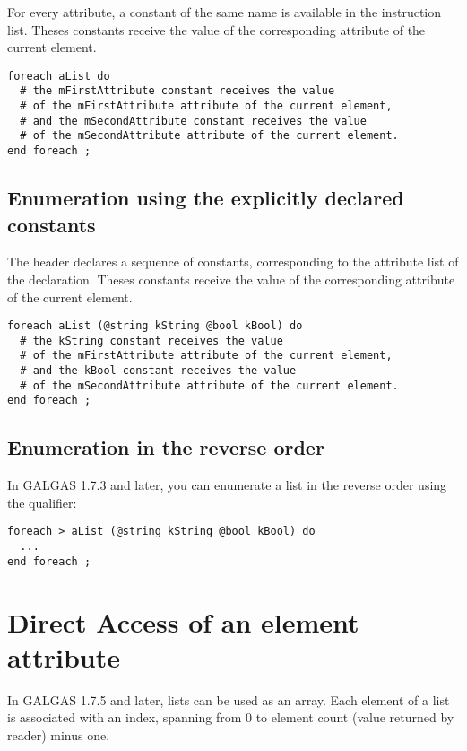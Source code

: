 For every attribute, a constant of the same name is available in the  instruction list. Theses constants receive the value of the corresponding attribute of the current element.

\begin{lstlisting}[language=galgas]
foreach aList do
  # the mFirstAttribute constant receives the value
  # of the mFirstAttribute attribute of the current element,
  # and the mSecondAttribute constant receives the value
  # of the mSecondAttribute attribute of the current element.
end foreach ;
\end{lstlisting}

\subsection{Enumeration using the explicitly declared constants}

The  header declares a sequence of constants, corresponding to the attribute list of the  declaration. Theses constants receive the value of the corresponding attribute of the current element.


\begin{lstlisting}[language=galgas]
foreach aList (@string kString @bool kBool) do
  # the kString constant receives the value
  # of the mFirstAttribute attribute of the current element,
  # and the kBool constant receives the value
  # of the mSecondAttribute attribute of the current element.
end foreach ;
\end{lstlisting}

\subsection{Enumeration in the reverse order}

In GALGAS 1.7.3 and later, you can enumerate a list in the reverse order using the \galgas{>} qualifier:

\begin{lstlisting}[language=galgas]
foreach > aList (@string kString @bool kBool) do
  ...
end foreach ;
\end{lstlisting}




\section{Direct Access of an element attribute}

In GALGAS 1.7.5 and later, lists can be used as an array. Each element of a list is associated with an  index, spanning from 0 to element count (value returned by  reader) minus one.

